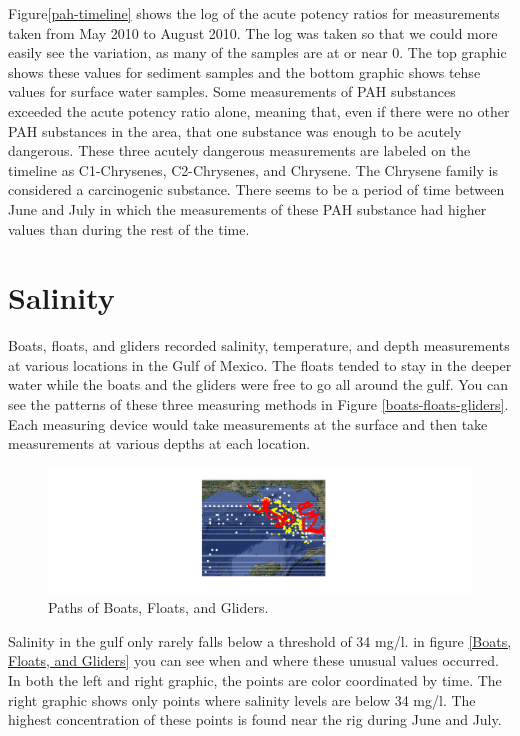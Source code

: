 \documentclass[11pt]{article}
\begin{document}
Figure\ref {pah-timeline} shows the log of the acute potency ratios for measurements taken from May 2010 to August 2010. The log was taken so that we could more easily see the variation, as many of the samples are at or near 0. The top graphic shows these values for sediment samples and the bottom graphic shows tehse values for surface water samples.  Some measurements of PAH substances exceeded the acute potency ratio alone, meaning that, even if there were no other PAH substances in the area, that one substance was enough to be acutely dangerous.  These three acutely dangerous measurements are labeled on the timeline as C1-Chrysenes, C2-Chrysenes, and Chrysene.  The Chrysene family is considered a carcinogenic substance.  There seems to be a period of time between June and July in which the measurements of these PAH substance had higher values than during the rest of the time.    

\section{Salinity}
Boats, floats, and gliders recorded salinity, temperature, and depth measurements at various locations in the Gulf of Mexico. The floats tended to stay in the deeper water while the boats and the gliders were free to go all around the gulf.  You can see the patterns of these three measuring methods in Figure \ref {boats-floats-gliders}. Each measuring device would take measurements at the surface and then take measurements at various depths at each location.  

\begin{figure}[htbp] %
   \centering
   \includegraphics[width=5in]{boats-floats-gliders.png} 
   \caption{Paths of Boats, Floats, and Gliders. }
   \label{Boats, Floats and Gliders}
\end{figure}
Salinity in the gulf only rarely falls below a threshold of 34 mg/l. in figure \ref {Boats, Floats, and Gliders} you can see when and where these unusual values occurred.  In both the left and right graphic, the points are color coordinated by time. The right graphic shows only points where salinity levels are below 34 mg/l. The highest concentration of these points is found near the rig during June and July.  
\end{document}
